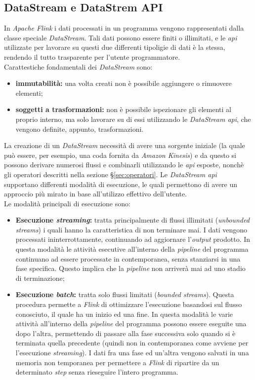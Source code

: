 \subsection{DataStream e DataStrem API}
In \textit{Apache Flink} i dati processati in un programma vengono rappresentati dalla classe speciale \textit{DataStream}.
Tali dati possono essere finiti o illimitati, e le \textit{\gls{api}} utilizzate per lavorare su questi due differenti tipoligie di dati è la stessa, rendendo il tutto trasparente per l'utente programmatore.\\
Carattestiche fondamentali dei \textit{DataStream} sono:
\begin{itemize}
	\item{\textbf{immutabilità:} una volta creati non è possibile aggiungere o rimuovere elementi;}
	\item{\textbf{soggetti a trasformazioni:} non è possibile ispezionare gli elementi al proprio interno, ma solo lavorare su di essi utilizzando le \textit{DataStream \textit{\gls{api}}}, che vengono definite, appunto, trasformazioni.}
\end{itemize}
La creazione di un \textit{DataStream} necessità di avere una sorgente iniziale (la quale può essere, per esempio, una coda fornita da \textit{\gls{Amazon Kinesis}}) e da questo si possono derivare numerosi flussi e combinarli utilizzando le \textit{\gls{api}} esposte, nonchè gli operatori descritti nella sezione \S\ref{sec:operatori}.
Le \textit{DataStream \textit{\gls{api}}} supportano differenti modalità di esecuzione, le quali permettono di avere un approccio più mirato in base all'utilizzo effettivo dell'utente.\\
Le modalità principali di esecuzione sono:
\begin{itemize}
	\item{\textbf{Esecuzione \textit{streaming}:} tratta principalmente di flussi illimitati (\textit{\gls{unbounded streams}}) i quali hanno la caratteristica di non terminare mai. I dati vengono processati ininterrottamente, continuando ad aggiornare l'\textit{output} prodotto. In questa modalità le attività esecutive all'interno della \textit{\gls{pipeline}} del programma continuano ad essere processate in contemporanea, senza stanziarsi in una fase specifica. Questo implica che la \textit{\gls{pipeline}} non arriverà mai ad uno stadio di terminazione;}
	\item{\textbf{Esecuzione \textit{batch}:} tratta solo flussi limitati (\textit{\gls{bounded streams}}). Questa procedura permette a \textit{Flink} di ottimizzare l'esecuzione basandosi sul flusso conosciuto, il quale ha un inizio ed una fine. In questa modalità le varie attività all'interno della \textit{\gls{pipeline}} del programma possono essere eseguite una dopo l'altra, permettendo di passare alla fase successiva solo quando si è terminata quella precedente (quindi non in contemporanea come avviene per l'esecuzione \textit{streaming}). I dati fra una fase ed un'altra vengono salvati in una memoria non temporanea per permettere a \textit{Flink} di ripartire da un determinato \textit{step} senza rieseguire l'intero programma.}
\end{itemize}

